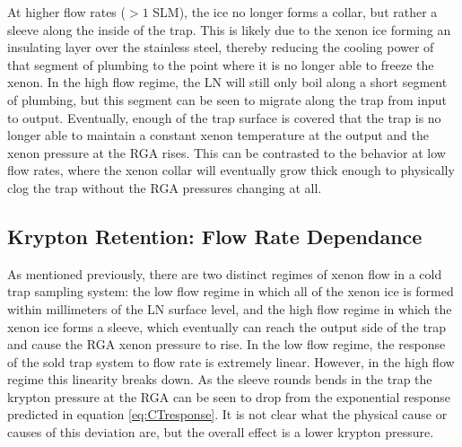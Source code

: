 \documentclass[12pt]{article}
\begin{document}
At higher flow rates ($>1$ SLM), the ice no longer forms a collar, but rather a sleeve along the inside of the trap. This is likely due to the xenon ice forming an insulating layer over the stainless steel, thereby reducing the cooling power of that segment of plumbing to the point where it is no longer able to freeze the xenon. In the high flow regime, the LN will still only boil along a short segment of plumbing, but this segment can be seen to migrate along the trap from input to output. Eventually, enough of the trap surface is covered that the trap is no longer able to maintain a constant xenon temperature at the output and the xenon pressure at the RGA rises. This can be contrasted to the behavior at low flow rates, where the xenon collar will eventually grow thick enough to physically clog the trap without the RGA pressures changing at all.

\subsection{Krypton Retention: Flow Rate Dependance}
As mentioned previously, there are two distinct regimes of xenon flow in a cold trap sampling system: the low flow regime in which all of the xenon ice is formed within millimeters of the LN surface level, and the high flow regime in which the xenon ice forms a sleeve, which eventually can reach the output side of the trap and cause the RGA xenon pressure to rise. In the low flow regime, the response of the sold trap system to flow rate is extremely linear. However, in the high flow regime this linearity breaks down. As the sleeve rounds bends in the trap the krypton pressure at the RGA can be seen to drop from the exponential response predicted in equation \ref{eq:CTresponse}. It is not clear what the physical cause or causes of this deviation are, but the overall effect is a lower krypton pressure. 
\end{document}
